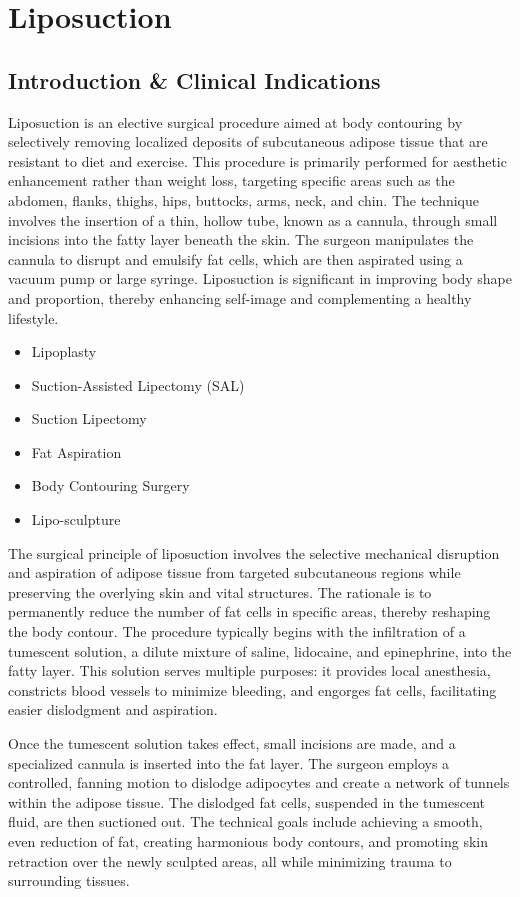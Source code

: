 \chapter{Liposuction}

\section*{Introduction \& Clinical Indications}
Liposuction is an elective surgical procedure aimed at body contouring by selectively removing localized deposits of subcutaneous adipose tissue that are resistant to diet and exercise. This procedure is primarily performed for aesthetic enhancement rather than weight loss, targeting specific areas such as the abdomen, flanks, thighs, hips, buttocks, arms, neck, and chin. The technique involves the insertion of a thin, hollow tube, known as a cannula, through small incisions into the fatty layer beneath the skin. The surgeon manipulates the cannula to disrupt and emulsify fat cells, which are then aspirated using a vacuum pump or large syringe. Liposuction is significant in improving body shape and proportion, thereby enhancing self-image and complementing a healthy lifestyle.

\begin{itemize}
  \item Lipoplasty
  \item Suction-Assisted Lipectomy (SAL)
  \item Suction Lipectomy
  \item Fat Aspiration
  \item Body Contouring Surgery
  \item Lipo-sculpture
\end{itemize}

The surgical principle of liposuction involves the selective mechanical disruption and aspiration of adipose tissue from targeted subcutaneous regions while preserving the overlying skin and vital structures. The rationale is to permanently reduce the number of fat cells in specific areas, thereby reshaping the body contour. The procedure typically begins with the infiltration of a tumescent solution, a dilute mixture of saline, lidocaine, and epinephrine, into the fatty layer. This solution serves multiple purposes: it provides local anesthesia, constricts blood vessels to minimize bleeding, and engorges fat cells, facilitating easier dislodgment and aspiration.

Once the tumescent solution takes effect, small incisions are made, and a specialized cannula is inserted into the fat layer. The surgeon employs a controlled, fanning motion to dislodge adipocytes and create a network of tunnels within the adipose tissue. The dislodged fat cells, suspended in the tumescent fluid, are then suctioned out. The technical goals include achieving a smooth, even reduction of fat, creating harmonious body contours, and promoting skin retraction over the newly sculpted areas, all while minimizing trauma to surrounding tissues.

